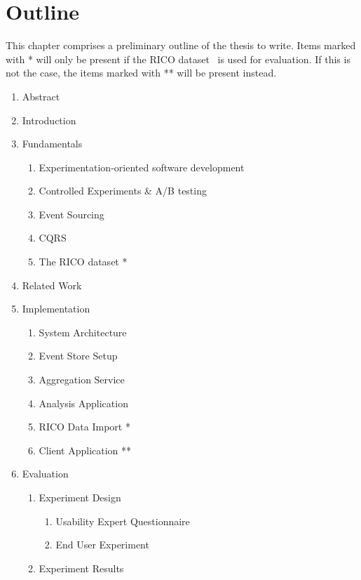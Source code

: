 %
\chapter{Outline}
\label{sec:outline}

This chapter comprises a preliminary outline of the thesis to write.
Items marked with * will only be present if the RICO dataset~\cite{Deka:2017:Rico} is used for evaluation.
If this is not the case, the items marked with ** will be present instead.

\begin{enumerate}[noitemsep,label=\arabic*.]
\item Abstract
\item Introduction
\item Fundamentals
	\begin{enumerate}[noitemsep,label=\arabic*.]
	\item Experimentation-oriented software development
	\item Controlled Experiments \& A/B testing
	\item Event Sourcing
	\item CQRS
	\item The RICO dataset *
	\end{enumerate}
\item Related Work
\item Implementation
	\begin{enumerate}[noitemsep,label=\arabic*.]
	\item System Architecture
	\item Event Store Setup
	\item Aggregation Service
	\item Analysis Application
	\item RICO Data Import *
	\item Client Application **
	\end{enumerate}
\item Evaluation
	\begin{enumerate}[noitemsep,label=\arabic*.]
	\item Experiment Design
		\begin{enumerate}[noitemsep,label=\arabic*.]
		\item Usability Expert Questionnaire
		\item End User Experiment
		\end{enumerate}
	\item Experiment Results
		\begin{enumerate}[noitemsep,label=\arabic*.]

\end{enumerate}
\end{enumerate}
\end{enumerate}
